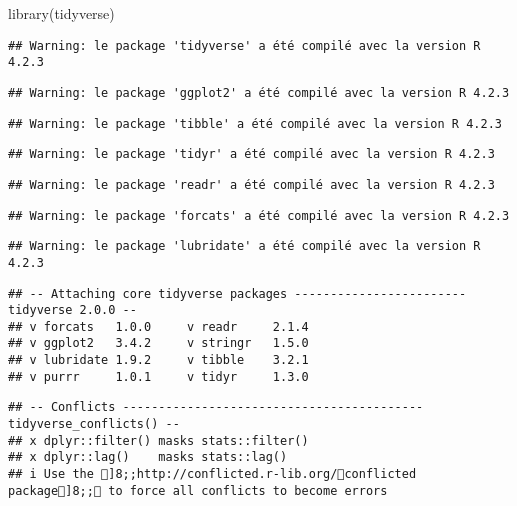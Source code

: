 \documentclass[
]{article}
\newenvironment{Shaded}{\begin{snugshade}}{\end{snugshade}}
\newcommand{\FunctionTok}[1]{\textcolor[rgb]{0.00,0.00,0.00}{#1}}
\newcommand{\NormalTok}[1]{#1}
\begin{document}
\begin{Shaded}
\begin{Highlighting}[]
\FunctionTok{library}\NormalTok{(tidyverse)}
\end{Highlighting}
\end{Shaded}

\begin{verbatim}
## Warning: le package 'tidyverse' a été compilé avec la version R 4.2.3
\end{verbatim}

\begin{verbatim}
## Warning: le package 'ggplot2' a été compilé avec la version R 4.2.3
\end{verbatim}

\begin{verbatim}
## Warning: le package 'tibble' a été compilé avec la version R 4.2.3
\end{verbatim}

\begin{verbatim}
## Warning: le package 'tidyr' a été compilé avec la version R 4.2.3
\end{verbatim}

\begin{verbatim}
## Warning: le package 'readr' a été compilé avec la version R 4.2.3
\end{verbatim}

\begin{verbatim}
## Warning: le package 'forcats' a été compilé avec la version R 4.2.3
\end{verbatim}

\begin{verbatim}
## Warning: le package 'lubridate' a été compilé avec la version R 4.2.3
\end{verbatim}

\begin{verbatim}
## -- Attaching core tidyverse packages ------------------------ tidyverse 2.0.0 --
## v forcats   1.0.0     v readr     2.1.4
## v ggplot2   3.4.2     v stringr   1.5.0
## v lubridate 1.9.2     v tibble    3.2.1
## v purrr     1.0.1     v tidyr     1.3.0
\end{verbatim}

\begin{verbatim}
## -- Conflicts ------------------------------------------ tidyverse_conflicts() --
## x dplyr::filter() masks stats::filter()
## x dplyr::lag()    masks stats::lag()
## i Use the ]8;;http://conflicted.r-lib.org/conflicted package]8;; to force all conflicts to become errors
\end{verbatim}
\end{document}
